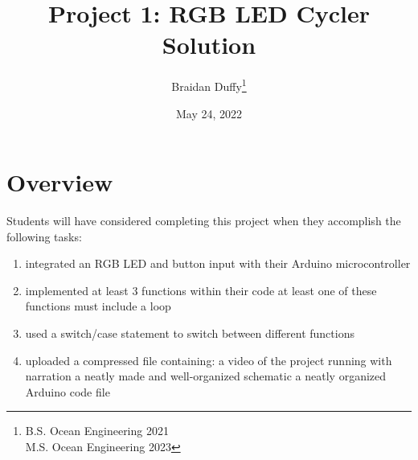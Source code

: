 \documentclass{article}
\title{Project 1: RGB LED Cycler Solution}
\author{Braidan Duffy\thanks{B.S. Ocean Engineering 2021\\M.S. Ocean Engineering 2023}}
\date{May 24, 2022}
\begin{document}
\maketitle

\section*{Overview}

Students will have considered completing this project when they accomplish the following tasks:
\begin{enumerate}
    \item integrated an RGB LED and button input with their Arduino microcontroller
    \item implemented at least 3 functions within their code
        \subitem at least one of these functions must include a loop
    \item used a switch/case statement to switch between different functions
    \item uploaded a compressed file containing:
        \subitem a video of the project running with narration
        \subitem a neatly made and well-organized schematic
        \subitem a neatly organized Arduino code file
\end{enumerate}
\end{document}
